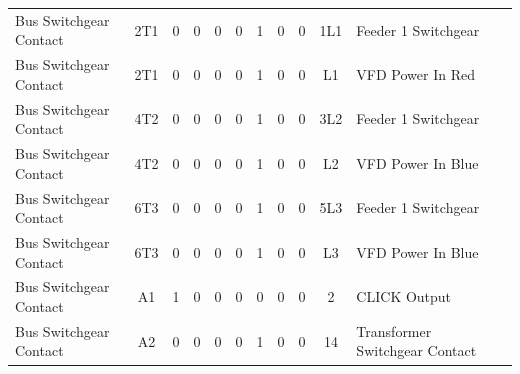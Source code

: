 \begin{table}[!htp]
{\begin{tabular}{lcccccccccll}
			Bus Switchgear Contact     & 2T1                     & 0                                           & 0                                          & 0           & 0           & 1            & 0                & 0 & 1L1                          & Feeder 1 Switchgear              &                \\
			Bus Switchgear Contact     & 2T1                     & 0                                           & 0                                          & 0           & 0           & 1            & 0                & 0 & L1                           & VFD Power In Red                 &                \\
			Bus Switchgear Contact     & 4T2                     & 0                                           & 0                                          & 0           & 0           & 1            & 0                & 0 & 3L2                          & Feeder 1 Switchgear              &                \\
			Bus Switchgear Contact     & 4T2                     & 0                                           & 0                                          & 0           & 0           & 1            & 0                & 0 & L2                           & VFD Power In Blue                &                \\
			Bus Switchgear Contact     & 6T3                     & 0                                           & 0                                          & 0           & 0           & 1            & 0                & 0 & 5L3                          & Feeder 1 Switchgear              &                \\
			Bus Switchgear Contact     & 6T3                     & 0                                           & 0                                          & 0           & 0           & 1            & 0                & 0 & L3                           & VFD Power In Blue                &                \\
			Bus Switchgear Contact     & A1                      & 1                                           & 0                                          & 0           & 0           & 0            & 0                & 0 & 2                            & CLICK Output                     &                \\
			Bus Switchgear Contact     & A2                      & 0                                           & 0                                          & 0           & 0           & 1            & 0                & 0 & 14                           & Transformer Switchgear Contact   &                \\

\end{tabular}}
\end{table}
